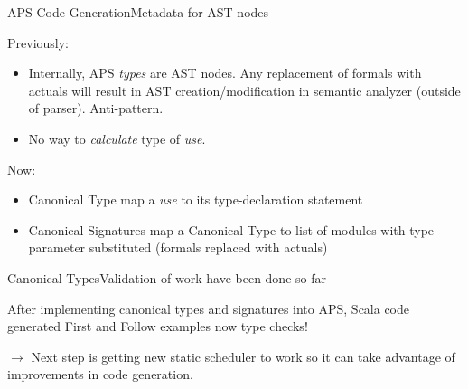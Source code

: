 \begin{frame}[fragile=singleslide]{APS Code Generation}{Metadata for AST nodes}

Previously:

\begin{itemize}
    \item Internally, APS \emph{types} are AST nodes. Any replacement of formals with actuals will result in AST creation/modification in semantic analyzer (outside of parser). \alert{Anti-pattern}.
    \item No way to \emph{calculate} type of \emph{use}.
\end{itemize}

Now:

\begin{itemize}
    \item \alert{Canonical Type} map a \emph{use} to its type-declaration statement
    \item \alert{Canonical Signatures} map a \alert{Canonical Type} to list of modules with type parameter \alert{substituted} (formals replaced with actuals)
\end{itemize}

\end{frame}


\begin{frame}{Canonical Types}{Validation of work have been done so far}
    
After implementing canonical types and signatures into APS, Scala code generated First and Follow examples \alert{now type checks}!

\newlinevspace

$\to$ Next step is getting new \alert{static scheduler} to work so it can take advantage of improvements in code generation.

\end{frame}